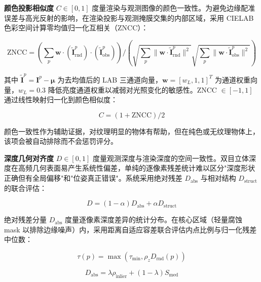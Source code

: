 \documentclass[9pt,twocolumn,letterpaper]{extarticle}
\begin{document}
\textbf{颜色投影相似度} $C \in [0,1]$ 度量渲染与观测图像的颜色一致性。为避免边缘配准误差与高光反射的影响，在渲染投影与观测掩膜交集的内部区域，采用 CIELAB 色彩空间计算零均值归一化互相关（ZNCC）：

\begin{equation}
\mathrm{ZNCC} = (\sum_{p} \mathbf{w} \cdot (\widetilde{\mathbf{I}}_{\mathrm{rnd}}^p) \cdot (\widetilde{\mathbf{I}}_{\mathrm{obs}}^p)) / (\sqrt{\sum_{p} \lVert \mathbf{w} \cdot \widetilde{\mathbf{I}}_{\mathrm{rnd}}^p \rVert^2} \sqrt{\sum_{p} \lVert \mathbf{w} \cdot \widetilde{\mathbf{I}}_{\mathrm{obs}}^p \rVert^2})
\label{eq:zncc}
\end{equation}


其中 $\widetilde{\mathbf{I}}^p = \mathbf{I}^p - \mathbf{\mu}$ 为去均值后的 LAB 三通道向量，$\mathbf{w} = [w_L, 1, 1]^T$ 为通道权重向量，$w_L = 0.3$ 降低亮度通道权重以减弱对光照变化的敏感性。ZNCC $\in [-1,1]$ 通过线性映射归一化到颜色相似度：

\begin{equation}
C = (1 + \mathrm{ZNCC}) / 2
\label{eq:color-sim}
\end{equation}


颜色一致性作为辅助证据，对纹理明显的物体有帮助，但在纯色或无纹理物体上，该项会被自动排除而不会惩罚评分。

\textbf{深度几何对齐度} $D \in [0,1]$ 度量观测深度与渲染深度的空间一致性。双目立体深度在高频几何表面易产生系统性偏差，单纯的逐像素残差统计难以区分"深度形状正确但有全局偏移"和"位姿真正错误"。系统采用绝对残差 $D_{\mathrm{abs}}$ 与相对结构 $D_{\mathrm{struct}}$ 的联合评估：

\begin{equation}
D = (1-\alpha) D_{\mathrm{abs}} + \alpha D_{\mathrm{struct}}
\label{eq:depth-joint}
\end{equation}


绝对残差分量 $D_{\mathrm{abs}}$ 度量逐像素深度差异的统计分布。在核心区域（轻量腐蚀 mask 以排除边缘噪声）内，采用距离自适应容差联合评估内点比例与归一化残差中位数：

\begin{equation}
\tau(p) = \max\!\left(\tau_{\mathrm{min}}, \rho_z D_{\mathrm{rnd}}(p)\right)
\label{eq:depth-thresh}
\end{equation}


\begin{equation}
D_{\mathrm{abs}} = \lambda \rho_{\mathrm{inlier}} + (1-\lambda) S_{\mathrm{med}}
\label{eq:depth-abs}
\end{equation}
\end{document}
